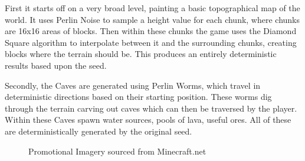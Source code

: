 \begin{flushleft}
                    \vspace{0.2cm}

                    First it starts off on a very broad level, painting a basic topographical map of the world. It uses Perlin Noise to sample
                    a height value for each chunk, where chunks are 16x16 areas of blocks. Then within these chunks the game uses the Diamond Square
                    algorithm to interpolate between it and the surrounding chunks, creating blocks where the terrain should be. This produces an 
                    entirely deterministic results based upon the seed.\\

                    \vspace{0.2cm}

                    Secondly, the Caves are generated using Perlin Worms, which travel in deterministic directions based on their starting position.
                    These worms dig through the terrain carving out caves which can then be traversed by the player. Within these Caves spawn water
                    sources, pools of lava, useful ores. All of these are deterministically generated by the original seed. \\ 


                    \begin{figure}[h]
                        \centering
                        \qquad
                        \caption*{Promotional Imagery sourced from Minecraft.net}
                    \end{figure}


\end{flushleft}
